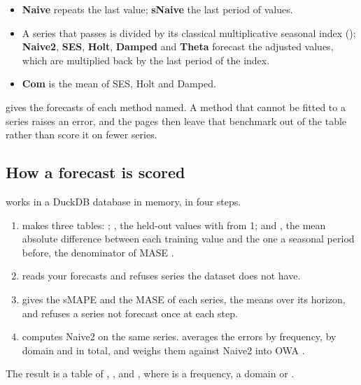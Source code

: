 \begin{itemize}
  \item \textbf{Naive} repeats the last value; \textbf{sNaive} the last period of values.
  \item A series that passes  is divided by its classical multiplicative seasonal index
    (); \textbf{Naive2}, \textbf{SES}, \textbf{Holt}, \textbf{Damped} and \textbf{Theta}
     forecast the adjusted values, which are multiplied back by
    the last period of the index.
  \item \textbf{Com} is the mean of SES, Holt and Damped.
\end{itemize}

 gives the forecasts of each method named. A method that cannot be fitted
to a series raises an error, and the pages then leave that benchmark out of the table rather than score it on fewer
series.

\subsection{How a forecast is scored}

 works in a DuckDB database in memory, in four steps.
\begin{enumerate}
  \item {} makes three tables: ; , the held-out values with 
    from 1; and , the mean absolute difference between each training value and the one a seasonal period
    before, the denominator of MASE .
  \item {} reads your forecasts and refuses series the dataset does not have.
  \item {} gives the sMAPE and the MASE of each series, the means over its horizon, and refuses a series
    not forecast once at each step.
  \item {} computes Naive2 on the same series.  averages the errors by frequency, by
    domain and in total, and weighs them against Naive2 into OWA
    .
\end{enumerate}

The result is a table of , ,  and , where  is a
frequency, a domain or .

